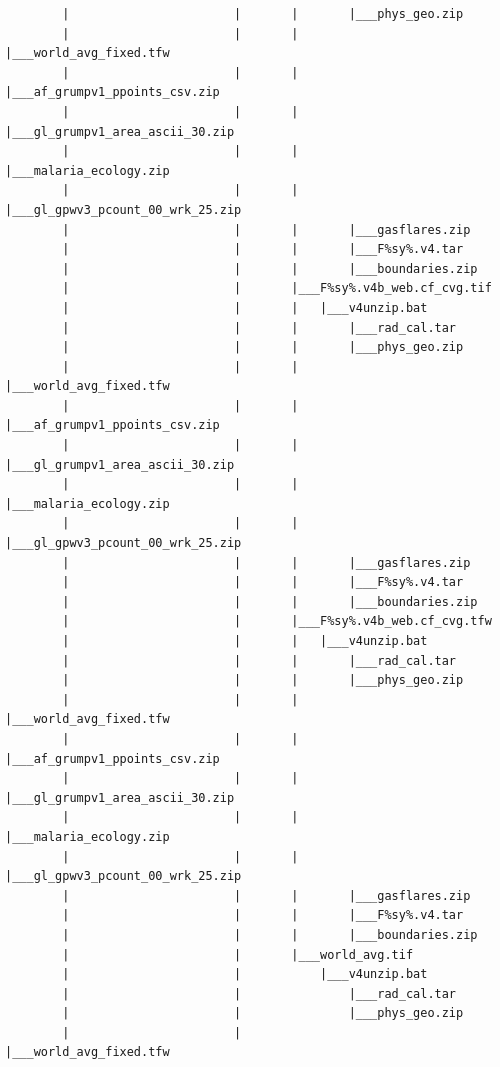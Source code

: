 \documentclass[]{book}
\begin{document}
\begin{verbatim}
        |                       |       |       |___phys_geo.zip
        |                       |       |       |___world_avg_fixed.tfw
        |                       |       |       |___af_grumpv1_ppoints_csv.zip
        |                       |       |       |___gl_grumpv1_area_ascii_30.zip
        |                       |       |       |___malaria_ecology.zip
        |                       |       |       |___gl_gpwv3_pcount_00_wrk_25.zip
        |                       |       |       |___gasflares.zip
        |                       |       |       |___F%sy%.v4.tar
        |                       |       |       |___boundaries.zip
        |                       |       |___F%sy%.v4b_web.cf_cvg.tif
        |                       |       |   |___v4unzip.bat
        |                       |       |       |___rad_cal.tar
        |                       |       |       |___phys_geo.zip
        |                       |       |       |___world_avg_fixed.tfw
        |                       |       |       |___af_grumpv1_ppoints_csv.zip
        |                       |       |       |___gl_grumpv1_area_ascii_30.zip
        |                       |       |       |___malaria_ecology.zip
        |                       |       |       |___gl_gpwv3_pcount_00_wrk_25.zip
        |                       |       |       |___gasflares.zip
        |                       |       |       |___F%sy%.v4.tar
        |                       |       |       |___boundaries.zip
        |                       |       |___F%sy%.v4b_web.cf_cvg.tfw
        |                       |       |   |___v4unzip.bat
        |                       |       |       |___rad_cal.tar
        |                       |       |       |___phys_geo.zip
        |                       |       |       |___world_avg_fixed.tfw
        |                       |       |       |___af_grumpv1_ppoints_csv.zip
        |                       |       |       |___gl_grumpv1_area_ascii_30.zip
        |                       |       |       |___malaria_ecology.zip
        |                       |       |       |___gl_gpwv3_pcount_00_wrk_25.zip
        |                       |       |       |___gasflares.zip
        |                       |       |       |___F%sy%.v4.tar
        |                       |       |       |___boundaries.zip
        |                       |       |___world_avg.tif
        |                       |           |___v4unzip.bat
        |                       |               |___rad_cal.tar
        |                       |               |___phys_geo.zip
        |                       |               |___world_avg_fixed.tfw

\end{verbatim}
\end{document}
